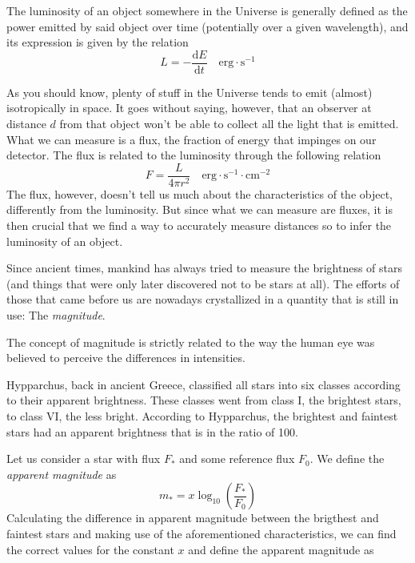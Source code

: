 \par The luminosity of an object somewhere in the Universe is generally defined as the power emitted by said object over time (potentially over a given wavelength), and its expression is given by the relation
\begin{equation}
    L = -\frac{\text{d}E}{\text{d}t} \quad \text{erg}\cdot\text{s}^{-1}
    \label{eq:luminosity}
\end{equation}
\par As you should know, plenty of stuff in the Universe tends to emit (almost) isotropically in space. It goes without saying, however, that an observer at distance $d$ from that object won't be able to collect all the light that is emitted. What we can measure is a flux, the fraction of energy that impinges on our detector. The flux is related to the luminosity through the following relation
\begin{equation}
    F = \frac{L}{4\pi r^{2}} \quad \text{erg}\cdot\text{s}^{-1}\cdot\text{cm}^{-2}
    \label{eq:flux}
\end{equation}
The flux, however, doesn't tell us much about the characteristics of the object, differently from the luminosity. But since what we can measure are fluxes, it is then crucial that we find a way to accurately measure distances so to infer the luminosity of an object.
\par Since ancient times, mankind has always tried to measure the brightness of stars (and things that were only later discovered not to be stars at all). The efforts of those that came before us are nowadays crystallized in a quantity that is still in use: The \emph{magnitude}.
\par The concept of magnitude is strictly related to the way the human eye was believed to perceive the differences in intensities.
\par Hypparchus, back in ancient Greece, classified all stars into six classes according to their apparent brightness. These classes went from class I, the brightest stars, to class VI, the less bright. According to Hypparchus, the brightest and faintest stars had an apparent brightness that is in the ratio of 100.
\par Let us consider a star with flux $F_{*}$ and some reference flux $F_{0}$. We define the \emph{apparent magnitude} as 
\begin{equation*}
    m_{*} = x \log_{10}\left(\frac{F_{*}}{F_{0}}\right)
\end{equation*}
Calculating the difference in apparent magnitude between the brigthest and faintest stars and making use of the aforementioned characteristics, we can find the correct values for the constant $x$ and define the apparent magnitude as
